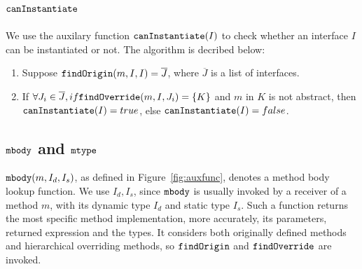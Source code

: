 \subsection{$\texttt{canInstantiate}$}
We use the auxilary function $\texttt{canInstantiate}(I)$ to check whether an interface $I$ can be instantiated or not.
The algorithm is decribed below:
\begin{enumerate}
\item Suppose $\texttt{findOrigin}(m, I, I) = \overline{J}$, where $\overline{J}$ is a list of interfaces.
\item If $\forall J_i \in \overline{J}, if \texttt{findOverride}(m, I, J_i) = \{ K \} $ and $m$ in $K$ is not abstract, 
then $\texttt{canInstantiate}(I) = true$, else $\texttt{canInstantiate}(I) = false$.
\end{enumerate}

\subsection{$\texttt{mbody}$ and $\texttt{mtype}$}

$\texttt{mbody}(m, I_d, I_s)$, as defined in Figure~\ref{fig:auxfunc}, denotes a method body lookup function.
We use $I_d, I_s$, since $\texttt{mbody}$ is usually invoked by a receiver of a method $m$, with its dynamic
type $I_d$ and static type $I_s$. Such a function returns the most specific method implementation, more
accurately, its parameters, returned expression and the types. It considers both originally defined methods and hierarchical overriding methods, so $\texttt{findOrigin}$ and $\texttt{findOverride}$ are invoked.

